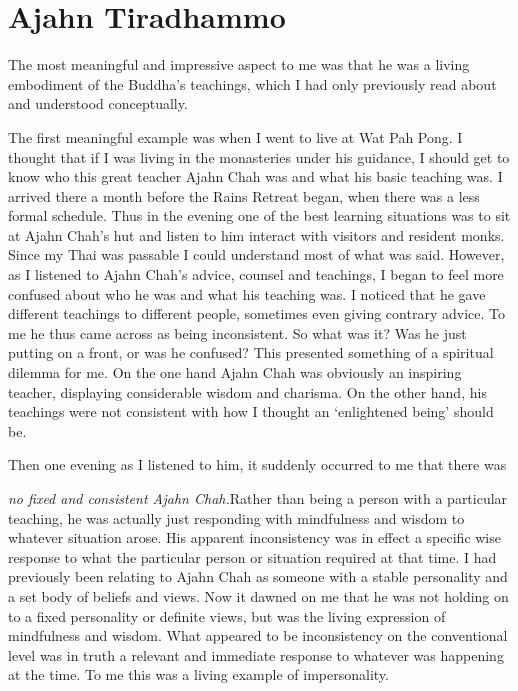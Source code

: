 \section{Ajahn Tiradhammo}

The most meaningful and impressive aspect to me was that he was a living
embodiment of the Buddha's teachings, which I had only previously read
about and understood conceptually.

The first meaningful example was when I went to live at Wat Pah Pong. I
thought that if I was living in the monasteries under his guidance, I
should get to know who this great teacher Ajahn Chah was and what his
basic teaching was. I arrived there a month before the Rains Retreat
began, when there was a less formal schedule. Thus in the evening one of
the best learning situations was to sit at Ajahn Chah's hut and listen
to him interact with visitors and resident monks. Since my Thai was
passable I could understand most of what was said. However, as I
listened to Ajahn Chah's advice, counsel and teachings, I began to feel
more confused about who he was and what his teaching was. I noticed that
he gave different teachings to different people, sometimes even giving
contrary advice. To me he thus came across as being inconsistent. So
what was it? Was he just putting on a front, or was he confused? This
presented something of a spiritual dilemma for me. On the one hand Ajahn
Chah was obviously an inspiring teacher, displaying considerable wisdom
and charisma. On the other hand, his teachings were not consistent with
how I thought an `enlightened being' should be.

Then one evening as I listened to him, it suddenly occurred to me that
there was

\emph{no fixed and consistent Ajahn Chah.}Rather than being a person
with a particular teaching, he was actually just responding with
mindfulness and wisdom to whatever situation arose. His apparent
inconsistency was in effect a specific wise response to what the
particular person or situation required at that time. I had previously
been relating to Ajahn Chah as someone with a stable personality and a
set body of beliefs and views. Now it dawned on me that he was not
holding on to a fixed personality or definite views, but was the living
expression of mindfulness and wisdom. What appeared to be inconsistency
on the conventional level was in truth a relevant and immediate response
to whatever was happening at the time. To me this was a living example
of impersonality.

